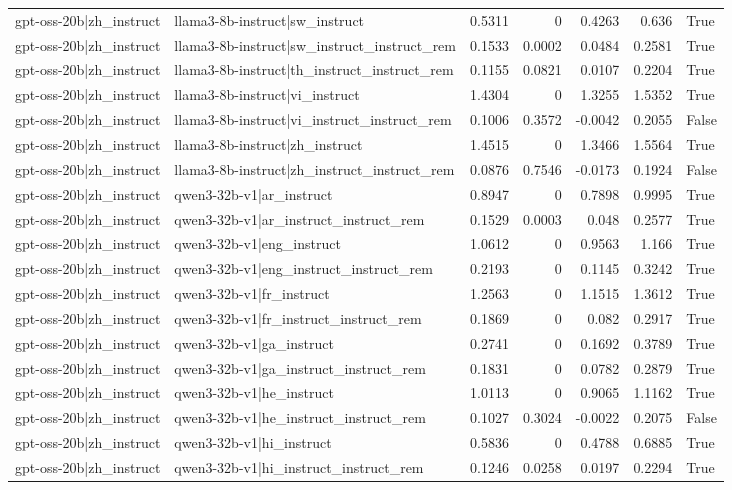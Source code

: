 \begin{table}
\begin{tabular}{l l r r r r l}
gpt-oss-20b|zh_instruct & llama3-8b-instruct|sw_instruct & 0.5311 & 0 & 0.4263 & 0.636 & True \\
gpt-oss-20b|zh_instruct & llama3-8b-instruct|sw_instruct_instruct_rem & 0.1533 & 0.0002 & 0.0484 & 0.2581 & True \\
gpt-oss-20b|zh_instruct & llama3-8b-instruct|th_instruct_instruct_rem & 0.1155 & 0.0821 & 0.0107 & 0.2204 & True \\
gpt-oss-20b|zh_instruct & llama3-8b-instruct|vi_instruct & 1.4304 & 0 & 1.3255 & 1.5352 & True \\
gpt-oss-20b|zh_instruct & llama3-8b-instruct|vi_instruct_instruct_rem & 0.1006 & 0.3572 & -0.0042 & 0.2055 & False \\
gpt-oss-20b|zh_instruct & llama3-8b-instruct|zh_instruct & 1.4515 & 0 & 1.3466 & 1.5564 & True \\
gpt-oss-20b|zh_instruct & llama3-8b-instruct|zh_instruct_instruct_rem & 0.0876 & 0.7546 & -0.0173 & 0.1924 & False \\
gpt-oss-20b|zh_instruct & qwen3-32b-v1|ar_instruct & 0.8947 & 0 & 0.7898 & 0.9995 & True \\
gpt-oss-20b|zh_instruct & qwen3-32b-v1|ar_instruct_instruct_rem & 0.1529 & 0.0003 & 0.048 & 0.2577 & True \\
gpt-oss-20b|zh_instruct & qwen3-32b-v1|eng_instruct & 1.0612 & 0 & 0.9563 & 1.166 & True \\
gpt-oss-20b|zh_instruct & qwen3-32b-v1|eng_instruct_instruct_rem & 0.2193 & 0 & 0.1145 & 0.3242 & True \\
gpt-oss-20b|zh_instruct & qwen3-32b-v1|fr_instruct & 1.2563 & 0 & 1.1515 & 1.3612 & True \\
gpt-oss-20b|zh_instruct & qwen3-32b-v1|fr_instruct_instruct_rem & 0.1869 & 0 & 0.082 & 0.2917 & True \\
gpt-oss-20b|zh_instruct & qwen3-32b-v1|ga_instruct & 0.2741 & 0 & 0.1692 & 0.3789 & True \\
gpt-oss-20b|zh_instruct & qwen3-32b-v1|ga_instruct_instruct_rem & 0.1831 & 0 & 0.0782 & 0.2879 & True \\
gpt-oss-20b|zh_instruct & qwen3-32b-v1|he_instruct & 1.0113 & 0 & 0.9065 & 1.1162 & True \\
gpt-oss-20b|zh_instruct & qwen3-32b-v1|he_instruct_instruct_rem & 0.1027 & 0.3024 & -0.0022 & 0.2075 & False \\
gpt-oss-20b|zh_instruct & qwen3-32b-v1|hi_instruct & 0.5836 & 0 & 0.4788 & 0.6885 & True \\
gpt-oss-20b|zh_instruct & qwen3-32b-v1|hi_instruct_instruct_rem & 0.1246 & 0.0258 & 0.0197 & 0.2294 & True \\

\end{tabular}
\end{table}
